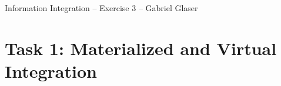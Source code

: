 \documentclass{scrartcl}
\begin{document}
	\begin{center}
		\LARGE
		Information Integration -- Exercise 3 -- Gabriel Glaser
	\end{center}
	\section*{Task 1: Materialized and Virtual Integration}
	\begin{center}
	\end{center}
\end{document}
